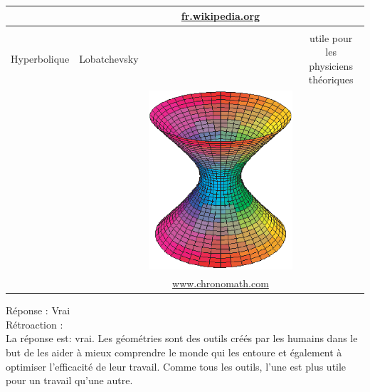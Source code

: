 \documentclass[letterpaper, 12pt]{article}
\begin{document}
\begin{center}
\begin{tabular}{|c|c|c|c|}
& & \href{http://fr.wikipedia.org/wiki/Trigonom\%C3\%A9trie_sph\%C3\%A9rique}{fr.wikipedia.org} & \\ \hline
& & & \\
Hyperbolique & Lobatchevsky & & utile pour les physiciens th\'eoriques\\
& & \includegraphics[scale=0.195]{lobatchevskian.eps} & \\
& & \href{http://www.chronomath.com}{www.chronomath.com} & \\ \hline
\end{tabular}
\end{center}

R\'eponse : Vrai\\

R\'etroaction :\\
La r\'eponse est: vrai. Les g\'eom\'etries sont des outils cr\'e\'es par les humains dans le but de les aider \`a mieux comprendre le monde qui les entoure et \'egalement \`a optimiser l'efficacit\'e de leur travail. Comme tous les outils, l'une est plus utile pour un travail qu'une autre.\\
\end{document}
